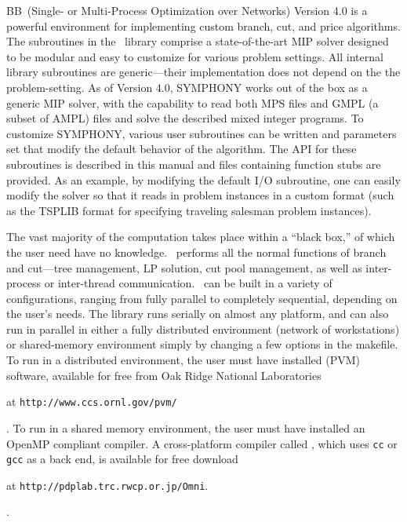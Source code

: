 BB\ (Single- or Multi-Process Optimization over Networks) Version 4.0 is a
powerful environment for implementing custom branch, cut, and price
algorithms. The subroutines in the \BB\ library comprise a state-of-the-art
MIP solver designed to be modular and easy to customize for various problem
settings. All internal library subroutines are generic---their implementation
does not depend on the the problem-setting. As of Version 4.0, SYMPHONY works
out of the box as a generic MIP solver, with the capability to read both MPS
files and GMPL (a subset of AMPL) files and solve the described mixed integer
programs. To customize SYMPHONY, various user subroutines can be written and
parameters set that modify the default behavior of the algorithm. The API for
these subroutines is described in this manual and files containing function
stubs are provided. As an example, by modifying the default I/O subroutine,
one can easily modify the solver so that it reads in problem instances in a
custom format (such as the TSPLIB format for specifying traveling salesman
problem instances).

The vast majority of the computation takes place within a ``black box,'' of
which the user need have no knowledge. \BB\ performs all the normal functions
of branch and cut---tree management, LP solution, cut pool management, as well
as inter-process or inter-thread communication. \BB\ can be built in a variety
of configurations, ranging from fully parallel to completely sequential,
depending on the user's needs. The library runs serially on almost any
platform, and can also run in parallel in either a fully distributed
environment (network of workstations) or shared-memory environment simply by
changing a few options in the makefile. To run in a distributed environment,
the user must have installed {\em
{}}
(PVM) software, available for free from Oak Ridge National Laboratories
\begin{latexonly}
at {\tt http://www.ccs.ornl.gov/pvm/} 
\end{latexonly}. 
To run in a shared memory environment, the user must have installed an
OpenMP compliant compiler. A cross-platform compiler called {\em
{}}, which uses 
{\tt cc} or {\tt gcc} as a back end, is available for free download
\begin{latexonly}
at {\tt http://pdplab.trc.rwcp.or.jp/Omni}.
\end{latexonly}.

